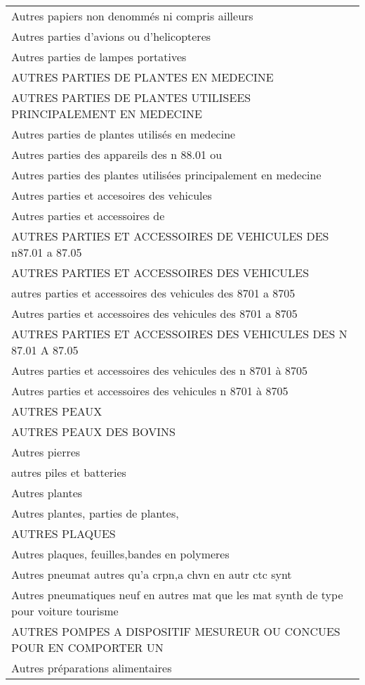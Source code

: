 \documentclass[
]{book}
\begin{document}
\begin{longtable}[t]{l}
Autres papiers non denommés ni compris ailleurs\\
Autres parties d'avions ou d'helicopteres\\
\addlinespace
Autres parties de lampes portatives\\
AUTRES PARTIES DE PLANTES EN MEDECINE\\
AUTRES PARTIES DE PLANTES UTILISEES PRINCIPALEMENT EN MEDECINE\\
Autres parties de plantes utilisés en medecine\\
Autres parties des appareils des n 88.01 ou\\
\addlinespace
Autres parties des plantes utilisées principalement en medecine\\
Autres parties et accesoires des vehicules\\
Autres parties et accessoires de\\
AUTRES PARTIES ET ACCESSOIRES DE VEHICULES DES n87.01 a 87.05\\
AUTRES PARTIES ET ACCESSOIRES DES VEHICULES\\
\addlinespace
autres parties et accessoires des vehicules des 8701 a 8705\\
Autres parties et accessoires des vehicules des 8701 a 8705\\
AUTRES PARTIES ET ACCESSOIRES DES VEHICULES DES N 87.01 A 87.05\\
Autres parties et accessoires des vehicules des n 8701 à 8705\\
Autres parties et accessoires des vehicules n 8701 à 8705\\
\addlinespace
AUTRES PEAUX\\
AUTRES PEAUX DES BOVINS\\
Autres pierres\\
autres piles et batteries\\
Autres plantes\\
\addlinespace
Autres plantes, parties de plantes,\\
AUTRES PLAQUES\\
Autres plaques, feuilles,bandes en polymeres\\
Autres pneumat autres qu'a crpn,a chvn en autr ctc synt\\
Autres pneumatiques neuf en autres mat que les mat synth de type pour voiture tourisme\\
\addlinespace
AUTRES POMPES A DISPOSITIF MESUREUR OU CONCUES POUR EN COMPORTER UN\\
Autres préparations alimentaires\\

\end{longtable}
\end{document}

